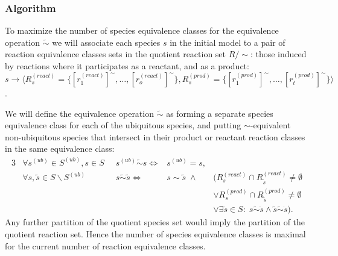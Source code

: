 \documentclass[10pt]{bmc_article}
\newenvironment{bmcformat}{\baselineskip20pt\sloppy\setboolean{publ}{false}}{\baselineskip20pt\sloppy}
\begin{document}
\begin{bmcformat}
\subsubsection*{Algorithm}
To maximize the number of species equivalence classes for the equivalence operation $\tilde{\sim}$ we will associate each species $s$ in the initial model to a pair of reaction equivalence classes sets in the quotient reaction set $R/{\sim}$: those induced by reactions where it participates as a reactant, and as a product: $s \rightarrow \langle R^{(react)}_s = \{[r^{(react)}_1]^{\sim}, \ldots, [r^{(react)}_o]^{\sim}\}, R^{(prod)}_s = \{[r^{(prod)}_1]^{\sim}, \ldots, [r^{(prod)}_t]^{\sim}\}\rangle$.

We will define the equivalence operation $\tilde{\sim}$ as forming a separate species equivalence class for each of the ubiquitous species, and putting $\sim$-equivalent non-ubiquitous species that intersect in their product or reactant reaction classes in the same equivalence class:
\begin{alignat*}{3}
& \forall s^{(ub)} \in S^{(ub)}, s \in S \;\; & s^{(ub)} \tilde{\sim} s \iff & s^{(ub)} = s, \\
& \forall s, \tilde{s} \in S \backslash S^{(ub)} \; & s \tilde{\sim} \tilde{s} \iff 
& s \sim \tilde{s}\;\land & (R^{(react)}_s \cap R^{(react)}_{\tilde{s}} \neq \emptyset\\
& ~ &  ~ &~ &\lor R^{(prod)}_s \cap R^{(prod)}_{\tilde{s}} \neq \emptyset\\
& ~ &  ~ &~ &\lor \exists \dot{s} \in S:\; s \tilde{\sim} \dot{s} \land \tilde{s} \tilde{\sim} \dot{s}). 
\end{alignat*}
Any further partition of the quotient species set would imply the partition of the quotient reaction set. Hence the number of species equivalence classes is maximal for the current number of reaction equivalence classes. \\


\end{bmcformat}
\end{document}
